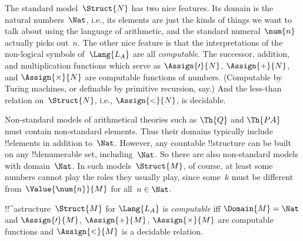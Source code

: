 \documentclass[../../../include/open-logic-section]{subfiles}
\begin{document}

\begin{explain}
The standard model~$\Struct{N}$ has two nice features. Its domain is
the natural numbers~$\Nat$, i.e., its elements are just the kinds of
things we want to talk about using the language of arithmetic, and the
standard numeral~$\num{n}$ actually picks out~$n$. The other nice
feature is that the interpretations of the non-logical symbols
of~$\Lang{L_A}$ are all \emph{computable}. The successor, addition,
and multiplication functions which serve as $\Assign{\prime}{N}$,
$\Assign{+}{N}$, and $\Assign{\times}{N}$ are computable functions of
numbers. (Computable by Turing machines, or definable by primitive
recursion, say.) And the less-than relation on~$\Struct{N}$, i.e.,
$\Assign{<}{N}$, is decidable.

Non-standard models of arithmetical theories such as $\Th{Q}$ and
$\Th{PA}$ must contain non-standard elements. Thus their domains
typically include !!{element}s in addition to~$\Nat$. However, any
countable !!{structure} can be built on any !!{denumerable} set,
including~$\Nat$. So there are also non-standard models with
domain~$\Nat$. In such models~$\Struct{M}$, of course, at least some
numbers cannot play the roles they usually play, since some~$k$ must
be different from~$\Value{\num{n}}{M}$ for all~$n \in \Nat$.
\end{explain}

\begin{defn}
!!^a{structure}~$\Struct{M}$ for $\Lang{L_A}$ is \emph{computable} iff
  $\Domain{M} = \Nat$ and $\Assign{\prime}{M}$, $\Assign{+}{M}$,
  $\Assign{\times}{M}$ are computable functions and $\Assign{<}{M}$ is
  a decidable relation.
\end{defn}
\end{document}
